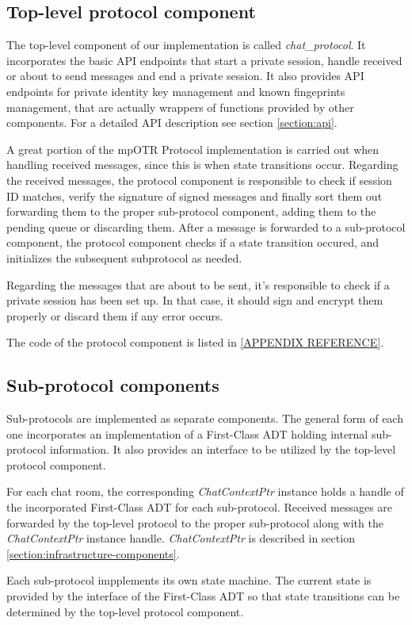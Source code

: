 \subsection{Top-level protocol component}
The top-level component of our implementation is called \emph{chat\_protocol}. It incorporates the basic API endpoints that start a private session, handle received or about to send messages and end a private session. It also provides API endpoints for private identity key management and known fingeprints management, that are actually wrappers of functions provided by other components. For a detailed API description see section \ref{section:api}.

A great portion of the mpOTR Protocol implementation is carried out when handling received messages, since this is when state transitions occur. Regarding the received messages, the protocol component is responsible to check if session ID matches, verify the signature of signed messages and finally sort them out forwarding them to the proper sub-protocol component, adding them to the pending queue or discarding them. After a message is forwarded to a sub-protocol component, the protocol component checks if a state transition occured, and initializes the subsequent subprotocol as needed.

Regarding the messages that are about to be sent, it's responsible to check if a private session has been set up. In that case, it should sign and encrypt them properly or discard them if any error occurs.

The code of the protocol component is listed in \ref{APPENDIX REFERENCE}.

\subsection{Sub-protocol components}
Sub-protocols are implemented as separate components. The general form of each one incorporates an implementation of a First-Class ADT holding internal sub-protocol information. It also provides an interface to be utilized by the top-level protocol component.

For each chat room, the corresponding \emph{ChatContextPtr} instance holds a handle of the incorporated First-Class ADT for each sub-protocol. Received messages are forwarded by the top-level protocol to the proper sub-protocol along with the \emph{ChatContextPtr} instance handle. \emph{ChatContextPtr} is described in section \ref{section:infrastructure-components}.

Each sub-protocol impplements its own state machine. The current state is provided by the interface of the First-Class ADT so that state transitions can be determined by the top-level protocol component.

